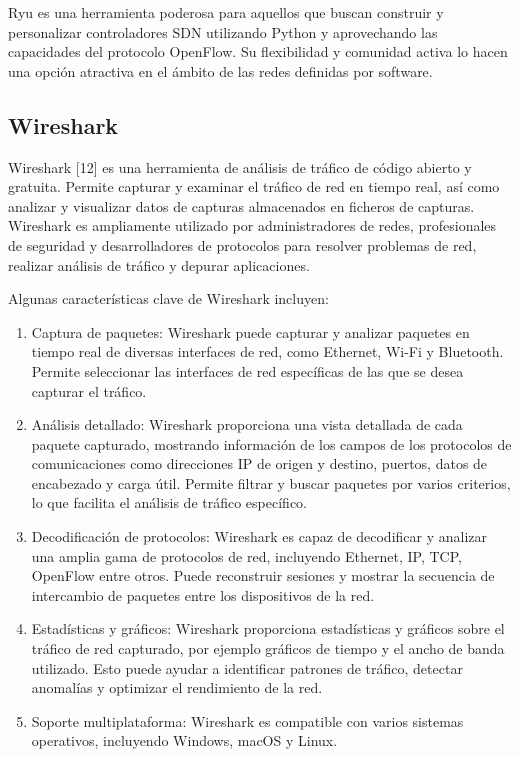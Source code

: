\documentclass[a4paper, 12pt]{book}
\begin{document}
	Ryu es una herramienta poderosa para aquellos que buscan construir y personalizar controladores SDN utilizando Python y aprovechando las capacidades del protocolo OpenFlow. Su flexibilidad y comunidad activa lo hacen una opción atractiva en el ámbito de las redes definidas por software.
	
	\subsection{Wireshark} 
	\label{sec:wireshark}
	
	Wireshark [12] es una herramienta de análisis de tráfico de código abierto y gratuita. Permite capturar y examinar el tráfico de red en tiempo real, así como analizar y visualizar datos de capturas almacenados en ficheros de capturas. Wireshark  es ampliamente utilizado por administradores de redes, profesionales de seguridad y desarrolladores de protocolos para resolver problemas de red, realizar análisis de tráfico y depurar aplicaciones.
	
	Algunas características clave de Wireshark incluyen:
	
	\begin{enumerate}
		\item 	Captura de paquetes: Wireshark puede capturar y analizar paquetes en tiempo real de diversas interfaces de red, como Ethernet, Wi-Fi y Bluetooth. Permite seleccionar las interfaces de red específicas de las que se desea capturar el tráfico.	
		\item 	Análisis detallado: Wireshark proporciona una vista detallada de cada paquete capturado, mostrando información de los campos de los protocolos de comunicaciones como direcciones IP de origen y destino, puertos, datos de encabezado y carga útil. Permite filtrar y buscar paquetes por varios criterios, lo que facilita el análisis de tráfico específico.
		\item 	Decodificación de protocolos: Wireshark es capaz de decodificar y analizar una amplia gama de protocolos de red, incluyendo Ethernet, IP, TCP, OpenFlow entre otros. Puede reconstruir sesiones y mostrar la secuencia de intercambio de paquetes entre los dispositivos de la red.
		\item 	Estadísticas y gráficos: Wireshark proporciona estadísticas y gráficos sobre el tráfico de red capturado, por ejemplo gráficos de tiempo y el ancho de banda utilizado. Esto puede ayudar a identificar patrones de tráfico, detectar anomalías y optimizar el rendimiento de la red.
		\item   Soporte multiplataforma: Wireshark es compatible con varios sistemas operativos, incluyendo Windows, macOS y Linux. 
	\end{enumerate}
	
\end{document}

